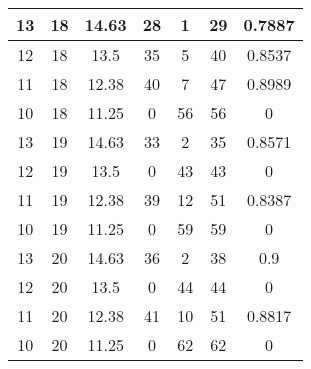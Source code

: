 \documentclass[letterpaper, 12pt]{article}
\begin{document}
\begin{longtable}{|c|c|c|c|c|c|c|}
\hline
13 & 18 & 14.63 & 28 & 1 & 29 & 0.7887 \\
\hline
12 & 18 & 13.5 & 35 & 5 & 40 & 0.8537 \\
\hline
11 & 18 & 12.38 & 40 & 7 & 47 & 0.8989 \\
\hline
10 & 18 & 11.25 & 0 & 56 & 56 & 0 \\
\hline
13 & 19 & 14.63 & 33 & 2 & 35 & 0.8571 \\
\hline
12 & 19 & 13.5 & 0 & 43 & 43 & 0 \\
\hline
11 & 19 & 12.38 & 39 & 12 & 51 & 0.8387 \\
\hline
10 & 19 & 11.25 & 0 & 59 & 59 & 0 \\
\hline
13 & 20 & 14.63 & 36 & 2 & 38 & 0.9 \\
\hline
12 & 20 & 13.5 & 0 & 44 & 44 & 0 \\
\hline
11 & 20 & 12.38 & 41 & 10 & 51 & 0.8817 \\
\hline
10 & 20 & 11.25 & 0 & 62 & 62 & 0 \\
\hline
\end{longtable}
\end{document}
